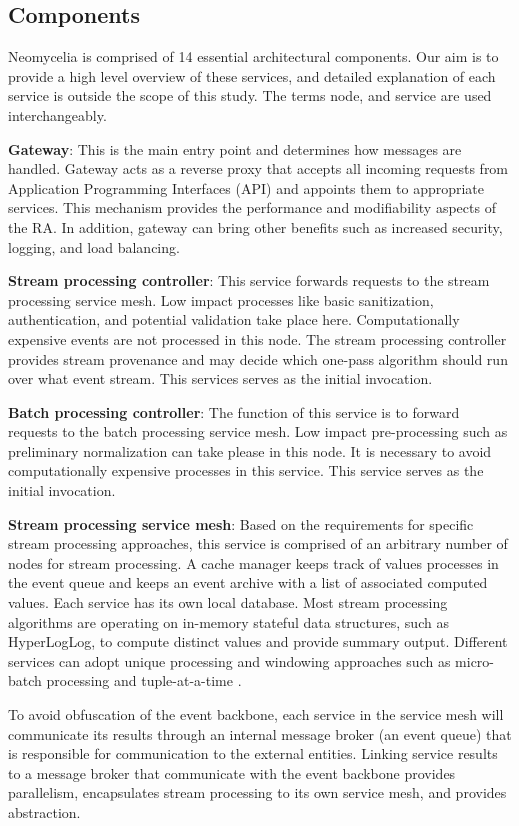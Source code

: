 \documentclass[conference]{IEEEtran}
\begin{document}
\subsection{Components}

Neomycelia is comprised of 14 essential architectural components. Our aim is to provide a high level overview of these services, and detailed explanation of each service is outside the scope of this study. The terms node, and service are used interchangeably.

\textbf{Gateway}: This is the main entry point and determines how messages are handled. Gateway acts as a reverse proxy that accepts all incoming requests from Application Programming Interfaces (API) and appoints them to appropriate services. This mechanism provides the performance and modifiability aspects of the RA. In addition, gateway can bring other benefits such as increased security, logging, and load balancing.

\textbf{Stream processing controller}: This service forwards requests to the stream processing service mesh. Low impact processes like basic sanitization, authentication, and potential validation take place here. Computationally expensive events are not processed in this node. The stream processing controller provides stream provenance and may decide which one-pass algorithm should run over what event stream. This services serves as the initial invocation.

\textbf{Batch processing controller}: The function of this service is to forward requests to the batch processing service mesh. Low impact pre-processing such as preliminary normalization can take please in this node. It is necessary to avoid computationally expensive processes in this service. This service serves as the initial invocation.

\textbf{Stream processing service mesh}: Based on the requirements for specific stream processing approaches, this service is comprised of an arbitrary number of nodes for stream processing. A cache manager keeps track of values processes in the event queue and keeps an event archive with a list of associated computed values. Each service has its own local database. Most stream processing algorithms are operating on in-memory stateful data structures, such as HyperLogLog, to compute distinct values and provide summary output. Different services can adopt unique processing and windowing approaches such as micro-batch processing and tuple-at-a-time \cite{Sahal}.

To avoid obfuscation of the event backbone, each service in the service mesh will communicate its results through an internal message broker (an event queue) that is responsible for communication to the external entities. Linking service results to a message broker that communicate with the event backbone provides parallelism, encapsulates stream processing to its own service mesh, and provides abstraction.
\end{document}
